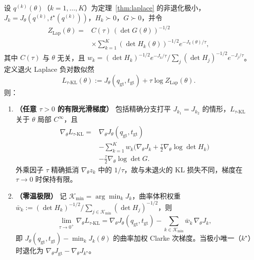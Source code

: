 \begin{theorem}\label{thm:annealed}
设 $q^{(k)}(\theta)$（$k=1,\dots,K$）为定理~\ref{thm:laplace} 的非退化极小，$J_k=J_\theta(q^{(k)},t^\star(q^{(k)}))$，$H_k\succ0$，$G\succ0$，并令
\begin{equation}
\begin{split}
Z_{\mathrm{Lap}}(\theta)={}&C(\tau)\,(\det G(\theta))^{-1/2}\\
&\times\sum_{k=1}^K(\det H_k(\theta))^{-1/2}e^{-J_k(\theta)/\tau},
\end{split}
\label{eq:zlap}
\end{equation}
其中 $C(\tau)$ 与 $\theta$ 无关，且 $w_k=(\det H_k)^{-1/2}e^{-J_k/\tau}/\sum_j(\det H_j)^{-1/2}e^{-J_j/\tau}$。定义退火 Laplace 负对数似然
\begin{equation}
L_{\tau\text{-KL}}(\theta):=J_\theta(q_{\mathrm{gt}},t_{\mathrm{gt}})+\tau\log Z_{\mathrm{Lap}}(\theta).
\label{eq:annealed}
\end{equation}
则：
\begin{enumerate}
\item \textbf{（任意 $\tau>0$ 的有限光滑梯度）} 包括精确分支打平 $J_{k_1}=J_{k_2}$ 的情形，$L_{\tau\text{-KL}}$ 关于 $\theta$ 局部 $C^\infty$，且
\begin{equation}
\begin{split}
\nabla_\theta L_{\tau\text{-KL}}={}&\nabla_\theta J_\theta(q_{\mathrm{gt}},t_{\mathrm{gt}})\\
&-\sum_{k=1}^Kw_k\Big(\nabla_\theta J_k+\frac{\tau}{2}\nabla_\theta\log\det H_k\Big)\\
&-\frac{\tau}{2}\nabla_\theta\log\det G .
\end{split}
\label{eq:annealedgrad}
\end{equation}
外乘因子 $\tau$ 精确抵消 $\nabla_\theta z_k$ 中的 $1/\tau$，故与未退火的 KL 损失不同，梯度在 $\tau\to0$ 时保持有限。
\item \textbf{（零温极限）} 记 $\mathcal{K}_{\min}=\arg\min_kJ_k$，曲率体积权重 $\bar w_k:=(\det H_k)^{-1/2}/\sum_{j\in\mathcal{K}_{\min}}(\det H_j)^{-1/2}$，则
\begin{equation}
\lim_{\tau\to0^+}\nabla_\theta L_{\tau\text{-KL}}
=\nabla_\theta J_\theta(q_{\mathrm{gt}},t_{\mathrm{gt}})
-\sum_{k\in\mathcal{K}_{\min}}\bar w_k\,\nabla_\theta J_k,
\label{eq:clarke}
\end{equation}
即 $J_\theta(q_{\mathrm{gt}},t_{\mathrm{gt}})-\min_kJ_k(\theta)$ 的曲率加权 Clarke 次梯度。当极小唯一（$k^\star$）时退化为 $\nabla_\theta J_{\mathrm{gt}}-\nabla_\theta J_{k^\star}$。
\end{enumerate}
\end{theorem}

